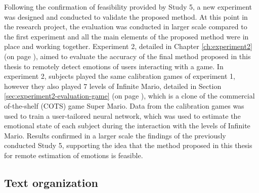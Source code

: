 Following the confirmation of feasibility provided by Study 5, a new experiment was designed and conducted to validate the proposed method. At this point in the research project, the evaluation was conducted in larger scale compared to the first experiment and all the main elements of the proposed method were in place and working together. Experiment 2, detailed in Chapter \ref{ch:experiment2} (on page \pageref{ch:experiment2}), aimed to evaluate the accuracy of the final method proposed in this thesis to remotely detect emotions of users interacting with a game. In experiment 2, subjects played the same calibration games of experiment 1, however they also played 7 levels of Infinite Mario, detailed in Section \ref{sec:experiment2-evaluation-game} (on page \pageref{sec:experiment2-evaluation-game}), which is a clone of the commercial of-the-shelf (COTS) game Super Mario. Data from the calibration games was used to train a user-tailored neural network, which was used to estimate the emotional state of each subject during the interaction with the levels of Infinite Mario. Results confirmed in a larger scale the findings of the previously conducted Study 5, supporting the idea that the method proposed in this thesis for remote estimation of emotions is feasible.

\subsection{Text organization}

